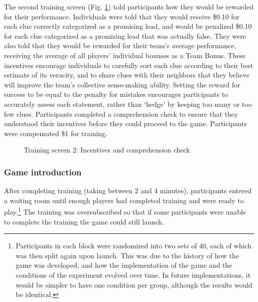\documentclass{article}
\begin{document}
The second training screen (Fig. \ref{fig:training2}) told participants how they would be rewarded for their performance. Individuals were told that they would receive \$0.10 for each clue correctly categorized as a promising lead, and would be penalized \$0.10 for each clue categorized as a promising lead that was actually false. They were also told that they would be rewarded for their team’s average performance, receiving the average of all players’ individual bonuses as a Team Bonus. These incentives encourage individuals to carefully sort each clue according to their best estimate of its veracity, and to share clues with their neighbors that they believe will improve the team’s collective sense-making ability. Setting the reward for success to be equal to the penalty for mistakes encourages participants to accurately assess each statement, rather than ‘hedge’ by keeping too many or too few clues. Participants completed a comprehension check to ensure that they understood their incentives before they could proceed to the game. Participants were compensated \$1 for training.

\begin{figure}[h!]
\centering
{}
\caption{Training screen 2: Incentives and comprehension check}
\label{fig:training2}
\end{figure}

\subsubsection{Game introduction}
After completing training (taking between 2 and 4 minutes), participants entered a waiting room until enough players had completed training and were ready to play.\footnote{Participants in each block were randomized into two sets of 40, each of which was then split again upon launch. This was due to the history of how the game was developed, and how the implementation of the game and the conditions of the experiment evolved over time. In future implementations, it would be simpler to have one condition per group, although the results would be identical.} The training was oversubscribed so that if some participants were unable to complete the training the game could still launch. 
\end{document}
